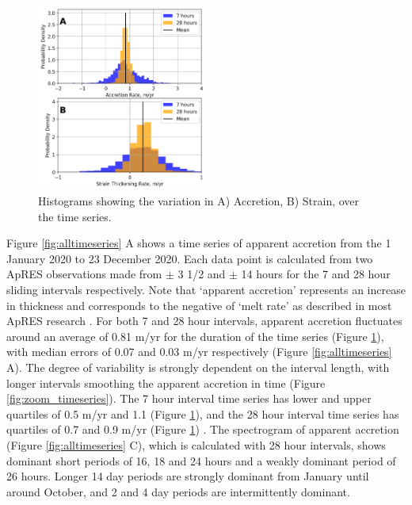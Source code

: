 \newpage




\begin{figure}[!ht]
\centering
\includegraphics[width=0.5\textwidth]{chapters/3/histogram.png}
\caption[Accretion and strain histograms]{Histograms showing the variation in A) Accretion, B) Strain, over the time series. 
}
\label{fig:histogram}
\end{figure}

Figure \ref{fig:alltimeseries} A shows a time series of apparent accretion from the 1  January 2020 to 23 December 2020.  Each data point is calculated from two ApRES observations made from $\pm$ 3 1/2 and $\pm$ 14 hours for the 7 and 28 hour sliding intervals respectively. Note that `apparent accretion' represents an increase in thickness and corresponds to the negative of `melt rate' as described in most ApRES research \cite[e.g.][]{vavnkova2021nature,lindback2019spatial}.
For both 7 and 28 hour intervals, apparent accretion fluctuates around an average of 0.81 m/yr  for the duration of the time series (Figure \ref{fig:histogram}), with median errors  of 0.07 and 0.03 m/yr respectively (Figure \ref{fig:alltimeseries} A).  The degree of variability is strongly dependent on the interval length, with longer intervals smoothing the apparent accretion in time (Figure \ref{fig:zoom_timeseries}). The 7 hour interval time series has lower and upper quartiles of 0.5 m/yr and  1.1 (Figure \ref{fig:histogram}), and the 28 hour interval time series has quartiles of 0.7 and 0.9 m/yr (Figure \ref{fig:histogram}) . The spectrogram of apparent accretion (Figure \ref{fig:alltimeseries} C), which is calculated with 28 hour intervals, shows dominant short periods of 16, 18 and 24 hours and a weakly dominant period of 26 hours. Longer 14 day periods are strongly dominant from January until around October, and 2 and 4 day periods are intermittently dominant. 

